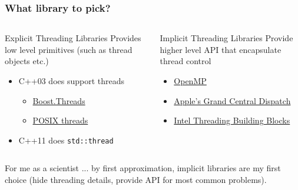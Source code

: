 \documentclass[9pt,pdftex]{beamer}
\begin{document}
\begin{frame}
  \frametitle{What library to pick?}
\begin{columns}
    \begin{column}{.45\textwidth}
      \begin{block}{Explicit Threading Libraries}
        Provides low level primitives (such as thread objects etc.)
        \begin{itemize}
        \item C++03 does support threads
          \begin{itemize}
          \item \href{http://www.boost.org/doc/libs/1_49_0/doc/html/thread.html}{Boost.Threads}
          \item \href{http://www.yolinux.com/TUTORIALS/LinuxTutorialPosixThreads.html}{POSIX threads}
          \end{itemize}
        \item C++11 does \texttt{std::thread}
        \end{itemize}
      \end{block}
    \end{column}
    \begin{column}{.45\textwidth}
      \begin{block}{Implicit Threading Libraries}
        Provide higher level API that encapsulate thread control
        \begin{itemize}
        \item \href{http://openmp.org/wp/}{OpenMP}
        \item \href{http://www.apple.com/osx/what-is/\#grandcentral}{Apple's Grand Central Dispatch}
        \item \href{http://threadingbuildingblocks.org/}{Intel Threading Building Blocks}
        \end{itemize}
      \end{block}
    \end{column}
  \end{columns}
\vfill
\begin{alertblock}{For me as a scientist ...}
  by first approximation, implicit libraries are my first choice (hide threading details, provide API for most common problems).
\end{alertblock}
\end{frame}
\end{document}
